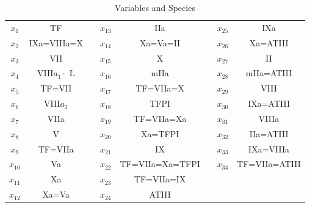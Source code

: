 \begin{table}
\begin{center}
\caption{ Variables and Species} \label{tabb} \vspace{3mm}
\begin{tabular}{|c|c|c|c|c|c|c|c|}\cline{1-2}
\cline{4-5}\cline{7-8} $x_{1}
$&TF&&$x_{13}$&IIa&&$x_{25}$&IXa\\\cline{1-2}\cline{4-5}\cline{7-8}
$x_{2}
$&IXa=VIIIa=X&&$x_{14}$&Xa=Va=II&&$x_{26}$&Xa=ATIII\\\cline{1-2}\cline{4-5}\cline{7-8}
$x_{3}
$&VII&&$x_{15}$&X&&$x_{27}$&II\\\cline{1-2}\cline{4-5}\cline{7-8}
$x_{4} $&VIII$a_1\cdot$
L&&$x_{16}$&mIIa&&$x_{28}$&mIIa=ATIII\\\cline{1-2}\cline{4-5}\cline{7-8}
$x_{5}
$&TF=VII&&$x_{17}$&TF=VIIa=X&&$x_{29}$&VIII\\\cline{1-2}\cline{4-5}\cline{7-8}
$x_{6}
$&VIII$a_2$&&$x_{18}$&TFPI&&$x_{30}$&IXa=ATIII\\\cline{1-2}\cline{4-5}\cline{7-8}
$x_{7}
$&VIIa&&$x_{19}$&TF=VIIa=Xa&&$x_{31}$&VIIIa\\\cline{1-2}\cline{4-5}\cline{7-8}
$x_{8}
$&V&&$x_{20}$&Xa=TFPI&&$x_{32}$&IIa=ATIII\\\cline{1-2}\cline{4-5}\cline{7-8}
$x_{9}
$&TF=VIIa&&$x_{21}$&IX&&$x_{33}$&IXa=VIIIa\\\cline{1-2}\cline{4-5}\cline{7-8}
$x_{10}$&Va&&$x_{22}$&TF=VIIa=Xa=TFPI&&$x_{34}$&TF=VIIa=ATIII\\\cline{1-2}\cline{4-5}\cline{7-8}
$x_{11}$&Xa&&$x_{23}$&TF=VIIa=IX&&$
$&\\\cline{1-2}\cline{4-5}\cline{7-8}
$x_{12}$&Xa=Va&&$x_{24}$&ATIII&&$
$&\\\cline{1-2}\cline{4-5}\cline{7-8}
\end{tabular}
\end{center}
\end{table}
